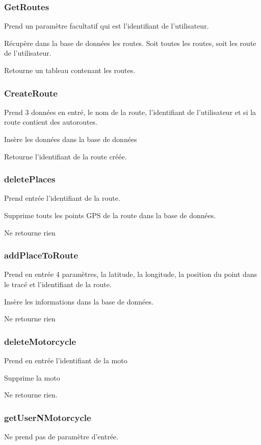 \documentclass[a4paper]{article}
\begin{document}
\subsubsection{GetRoutes}
Prend un paramètre facultatif qui est l'identifiant de l'utilisateur.

Récupère dans la base de données les routes. Soit toutes les routes, soit les route de l'utilisateur.

Retourne un tableau contenant les routes.

\subsubsection{CreateRoute}
Prend 3 données en entré, le nom de la route, l'identifiant de l'utilisateur et si la route contient des autoroutes.

Insère les données dans la base de données

Retourne l'identifiant de la route créée.

\subsubsection{deletePlaces}
Prend entrée l'identifiant de la route.

Supprime touts les points GPS de la route dans la base de données.

Ne retourne rien

\subsubsection{addPlaceToRoute}
Prend en entrée 4 paramètres, la latitude, la longitude, la position du point dans le tracé et l'identifiant de la route.

Insère les informations dans la base de données.

Ne retourne rien

\subsubsection{deleteMotorcycle}
Prend en entrée l'identifiant de la moto

Supprime la moto

Ne retourne rien.

\subsubsection{getUserNMotorcycle}
Ne prend pas de paramètre d'entrée.
\end{document}
